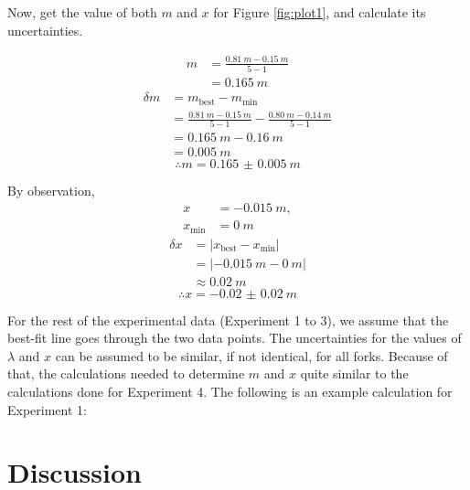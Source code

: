 \documentclass[letter]{article}
\numberwithin{equation}{section}
\begin{document}
Now, get the value of both \(m\) and \(x\) for Figure \ref{fig:plot1}, and calculate its uncertainties.

\begin{align*}
  m &= \frac{\SI{0.81}{m} - \SI{0.15}{m}}{5 - 1} \\
  &= \SI{0.165}{m}
\end{align*}
\begin{align*}
  \delta m &= m_{\mathrm{best}} - m_{\mathrm{min}} \\
  &= \frac{\SI{0.81}{m} - \SI{0.15}{m}}{5 - 1} - \frac{\SI{0.80}{m} - \SI{0.14}{m}}{5 - 1} \\
  &= \SI{0.165}{m} - \SI{0.16}{m} \\
  &= \SI{0.005}{m}
\end{align*}
\begin{equation*}
  \therefore m = \SI{0.165(5)}{m}
\end{equation*}

By observation,
\begin{align*}
  x &= \SI{-0.015}{m}, \\
  x_\mathrm{min} &= \SI{0}{m}
\end{align*}
\begin{align*}
  \delta x &= |x_{\mathrm{best}} - x_{\mathrm{min}}| \\
  &= |\SI{-0.015}{m} - \SI{0}{m}| \\
  &\approx \SI{0.02}{m}
\end{align*}
\begin{equation*}
  \therefore x = \SI{-0.02(2)}{m}
\end{equation*}

For the rest of the experimental data (Experiment 1 to 3), we assume that the best-fit line goes through the two data points. The uncertainties for the values of \(\lambda\) and \(x\) can be assumed to be similar, if not identical, for all forks. Because of that, the calculations needed to determine \(m\) and \(x\) quite similar to the calculations done for Experiment 4. The following is an example calculation for Experiment 1:


\section{Discussion}
\end{document}
